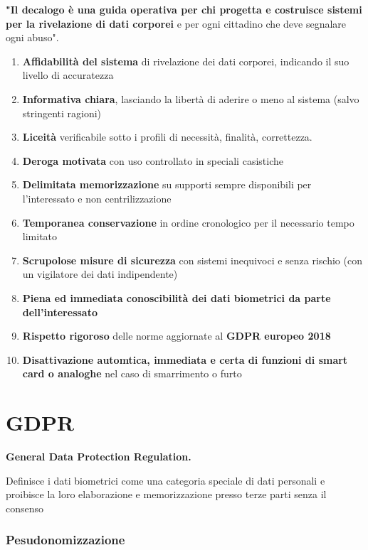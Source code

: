 \documentclass{report}
\begin{document}
\textbf{"Il decalogo è una guida operativa per chi progetta e costruisce sistemi per la rivelazione di dati corporei} e per ogni cittadino che deve segnalare ogni abuso".
\begin{enumerate}
    \item \textbf{Affidabilità del sistema} di rivelazione dei dati corporei, indicando il suo livello di accuratezza
    \item \textbf{Informativa chiara}, lasciando la libertà di aderire o meno al sistema (salvo stringenti ragioni)
    \item \textbf{Liceità} verificabile sotto i profili di necessità, finalità, correttezza.
    \item \textbf{Deroga motivata} con uso controllato in speciali casistiche
    \item \textbf{Delimitata memorizzazione} su supporti sempre disponibili per l'interessato e non centrilizzazione
    \item \textbf{Temporanea conservazione} in ordine cronologico per il necessario tempo limitato
    \item \textbf{Scrupolose misure di sicurezza} con sistemi inequivoci e senza rischio (con un vigilatore dei dati indipendente)
    \item \textbf{Piena ed immediata conoscibilità dei dati biometrici da parte dell'interessato}
    \item \textbf{Rispetto rigoroso} delle norme aggiornate al \textbf{GDPR europeo 2018}
    \item \textbf{Disattivazione automtica, immediata e certa di funzioni di smart card o analoghe} nel caso di smarrimento o furto
\end{enumerate}

\newpage
\section{GDPR}

\textbf{General Data Protection Regulation.}

\noindent Definisce i dati biometrici come una categoria speciale di dati personali e proibisce la loro elaborazione e memorizzazione presso terze parti senza il consenso

\subsubsection{Pesudonomizzazione}
\end{document}
